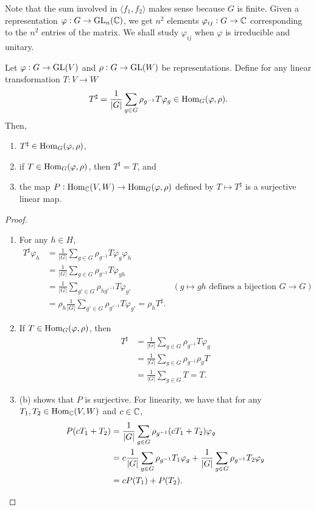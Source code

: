 		Note that the sum involved in $\langle f_1,f_2\rangle$ makes sense because $G$ is finite. Given a representation $\varphi : G \to \operatorname{GL}_n(\mathbb{C})$, we get $n^2$ elements $\varphi_{ij} : G \to \mathbb{C}$ corresponding to the $n^2$ entries of the matrix. We shall study $\varphi_{ij}$ when $\varphi$ is irreducible and unitary.

		\begin{fprop}
			\label{prop def: sharp}
			Let $\varphi : G \to \operatorname{GL}(V)$ and $\rho : G \to \operatorname{GL}(W)$ be representations. Define for any linear transformation $T : V \to W$
			\[ T^\sharp = \frac{1}{|G|} \sum_{g \in G} \rho_{g^{-1}} T \varphi_g \in \operatorname{Hom}_G(\varphi,\rho). \]
			Then,
			\begin{enumerate}[label=(\alph*)]
				\item $T^\sharp \in \operatorname{Hom}_G(\varphi,\rho)$,
				\item if $T \in \operatorname{Hom}_G(\varphi,\rho)$, then $T^\sharp = T$, and
				\item the map $P : \operatorname{Hom}_{\mathbb{C}}(V,W) \to \operatorname{Hom}_G(\varphi,\rho)$ defined by $T \mapsto T^\sharp$ is a surjective linear map.
			\end{enumerate}
		\end{fprop}
		\begin{proof}
			\phantom{pain}
			\begin{enumerate}
				\item For any $h \in H$,
				\begin{align*}
					T^\sharp \varphi_h &= \frac{1}{|G|} \sum_{g \in G} \rho_{g^{-1}} T \varphi_g \varphi_h \\
						&= \frac{1}{|G|} \sum_{g \in G} \rho_{g^{-1}} T \varphi_{gh} \\
						&= \frac{1}{|G|} \sum_{g' \in G} \rho_{hg'^{-1}} T \varphi_{g'} & (g \mapsto gh \text{ defines a bijection }G\to G) \\
						&= \rho_h \frac{1}{|G|} \sum_{g' \in G} \rho_{g'^{-1}} T \varphi_{g'} = \rho_h T^\sharp.
				\end{align*}

				\item If $T \in \operatorname{Hom}_G(\varphi,\rho)$, then
				\begin{align*}
					T^\sharp &= \frac{1}{|G|} \sum_{g \in G} \rho_{g^{-1}} T \varphi_g \\
						&= \frac{1}{|G|} \sum_{g \in G} \rho_{g^{-1}} \rho_g T \\
						&= \frac{1}{|G|} \sum_{g \in G} T = T.
				\end{align*}

				\item (b) shows that $P$ is surjective. For linearity, we have that for any $T_1,T_2 \in \operatorname{Hom}_{\mathbb{C}}(V,W)$ and $c \in \mathbb{C}$,
				\begin{align*}
					P(cT_1 + T_2) &= \frac{1}{|G|} \sum_{g \in G} \rho_{g^{-1}} (cT_1 + T_2) \varphi_g \\
						&= c \frac{1}{|G|} \sum_{g \in G} \rho_{g^{-1}} T_1 \varphi_g + \frac{1}{|G|} \sum_{g \in G} \rho_{g^{-1}} T_2 \varphi_g \\
						&= cP(T_1) + P(T_2). \qedhere
				\end{align*}
			\end{enumerate}
		\end{proof}

